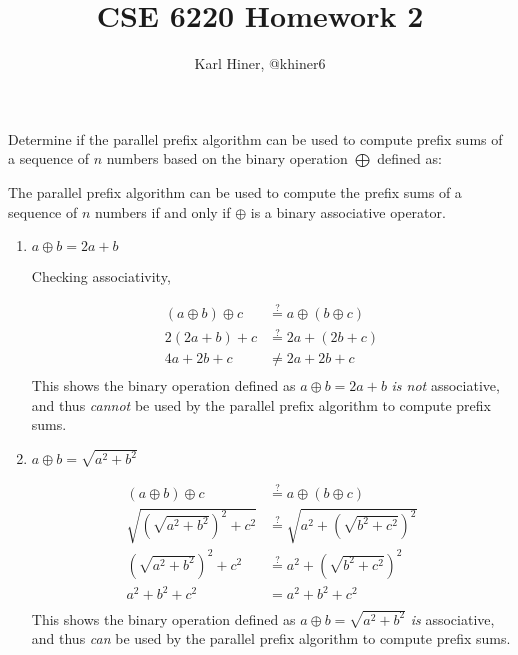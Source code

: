 \documentclass{article}
\newcommand{\aln}[1]{\begin{align*}#1\end{align*}}
\newcommand{\?}{\stackrel{?}{=}}
\begin{document}
\title{CSE 6220 Homework 2}
\author{Karl Hiner, @khiner6}
\date{}
\maketitle

\section{}

Determine if the parallel prefix algorithm can be used to compute prefix sums of a sequence of $n$ numbers based on the binary operation $\bigoplus$ defined as:

\quad The parallel prefix algorithm can be used to compute the prefix sums of a sequence of $n$ numbers if and only if $\oplus$ is a binary associative operator.
\begin{enumerate}[label=(\alph*)]
  \item $a \oplus b = 2a + b$

  \quad Checking associativity,

  \aln{
    (a \oplus b) \oplus c &\? a \oplus (b \oplus c)\\
    2(2a + b) + c &\? 2a + (2b + c)\\
    4a + 2b + c &\neq 2a + 2b + c\\
  }
  This shows the binary operation defined as $a \oplus b = 2a + b$ \textit{is not} associative, and thus \textit{cannot} be used by the parallel prefix algorithm to compute prefix sums.

  \item $a \oplus b = \sqrt{a^2 + b^2}$

  \aln{
    (a \oplus b) \oplus c &\? a \oplus (b \oplus c)\\
    \sqrt{\left(\sqrt{a^2 + b^2}\right)^2 + c^2} &\? \sqrt{a^2 + \left(\sqrt{b^2 + c^2}\right)^2}\\
    \left(\sqrt{a^2 + b^2}\right)^2 + c^2 &\? a^2 + \left(\sqrt{b^2 + c^2}\right)^2\\
    a^2 + b^2 + c^2 &= a^2 + b^2 + c^2\\
  }
  This shows the binary operation defined as $a \oplus b = \sqrt{a^2 + b^2}$ \textit{is} associative, and thus \textit{can} be used by the parallel prefix algorithm to compute prefix sums.
\end{enumerate}

\section{}
\end{document}
